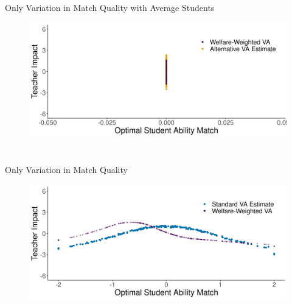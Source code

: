 \documentclass[11pt]{beamer}
\begin{document}

\section*{}
\begin{frame}[noframenumbering]{Only Variation in Match Quality with Average Students}

\hypertarget{np_cent2}{}
\vfill

\begin{figure}
    \centering
 \includegraphics[width=.75\textwidth]{slides/Figures/np_welfare_cent_run_2.png}
\end{figure}

\hyperlink{match_average2}{}

\end{frame}



\section*{}
\begin{frame}[noframenumbering]{Only Variation in Match Quality}

\hypertarget{st_cent3}{}
\vfill

\begin{figure}
    \centering
 \includegraphics[width=.75\textwidth]{slides/Figures/standard_est_cent_run_3.png}
\end{figure}

\hyperlink{match_quality1}{}

\end{frame}
\end{document}
